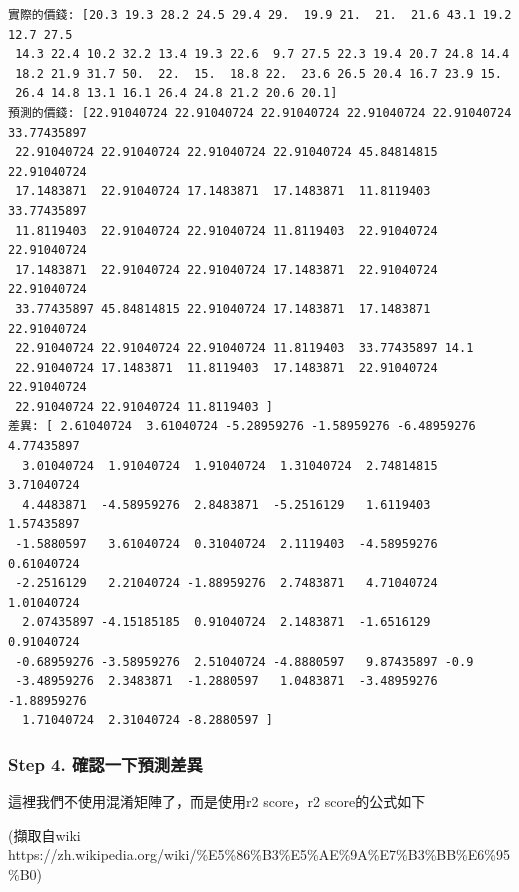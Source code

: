 \documentclass[11pt]{ctexart}
\begin{document}
    \begin{Verbatim}[commandchars=\\\{\}]
實際的價錢: [20.3 19.3 28.2 24.5 29.4 29.  19.9 21.  21.  21.6 43.1 19.2 12.7 27.5
 14.3 22.4 10.2 32.2 13.4 19.3 22.6  9.7 27.5 22.3 19.4 20.7 24.8 14.4
 18.2 21.9 31.7 50.  22.  15.  18.8 22.  23.6 26.5 20.4 16.7 23.9 15.
 26.4 14.8 13.1 16.1 26.4 24.8 21.2 20.6 20.1]
預測的價錢: [22.91040724 22.91040724 22.91040724 22.91040724 22.91040724 33.77435897
 22.91040724 22.91040724 22.91040724 22.91040724 45.84814815 22.91040724
 17.1483871  22.91040724 17.1483871  17.1483871  11.8119403  33.77435897
 11.8119403  22.91040724 22.91040724 11.8119403  22.91040724 22.91040724
 17.1483871  22.91040724 22.91040724 17.1483871  22.91040724 22.91040724
 33.77435897 45.84814815 22.91040724 17.1483871  17.1483871  22.91040724
 22.91040724 22.91040724 22.91040724 11.8119403  33.77435897 14.1
 22.91040724 17.1483871  11.8119403  17.1483871  22.91040724 22.91040724
 22.91040724 22.91040724 11.8119403 ]
差異: [ 2.61040724  3.61040724 -5.28959276 -1.58959276 -6.48959276  4.77435897
  3.01040724  1.91040724  1.91040724  1.31040724  2.74814815  3.71040724
  4.4483871  -4.58959276  2.8483871  -5.2516129   1.6119403   1.57435897
 -1.5880597   3.61040724  0.31040724  2.1119403  -4.58959276  0.61040724
 -2.2516129   2.21040724 -1.88959276  2.7483871   4.71040724  1.01040724
  2.07435897 -4.15185185  0.91040724  2.1483871  -1.6516129   0.91040724
 -0.68959276 -3.58959276  2.51040724 -4.8880597   9.87435897 -0.9
 -3.48959276  2.3483871  -1.2880597   1.0483871  -3.48959276 -1.88959276
  1.71040724  2.31040724 -8.2880597 ]

    \end{Verbatim}

    \hypertarget{step-4.-ux78baux8a8dux4e00ux4e0bux9810ux6e2cux5deeux7570}{%
\subsubsection{Step 4.
確認一下預測差異}\label{step-4.-ux78baux8a8dux4e00ux4e0bux9810ux6e2cux5deeux7570}}

這裡我們不使用混淆矩陣了，而是使用r2 score，r2 score的公式如下

(擷取自wiki
https://zh.wikipedia.org/wiki/\%E5\%86\%B3\%E5\%AE\%9A\%E7\%B3\%BB\%E6\%95\%B0)
\end{document}
